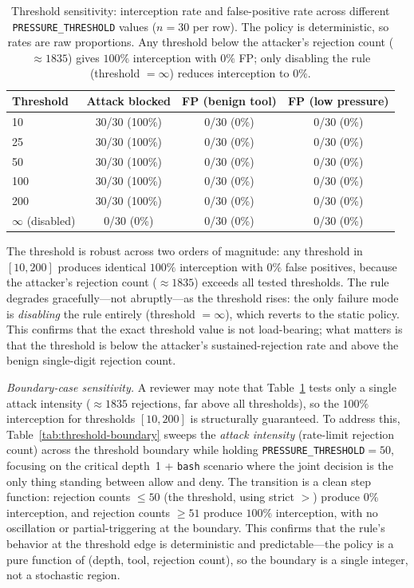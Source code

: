 \begin{table}[t]
\centering
\caption{Threshold sensitivity: interception rate and false-positive
rate across different \texttt{PRESSURE\_THRESHOLD} values ($n=30$ per
row). The policy is deterministic, so rates are raw proportions. Any
threshold below the attacker's rejection count ($\approx 1835$) gives
$100\%$ interception with $0\%$ FP; only disabling the rule (threshold
$=\infty$) reduces interception to $0\%$.}
\label{tab:ablation-threshold}
\begin{tabular}{lccc}
\toprule
Threshold & Attack blocked & FP (benign tool) & FP (low pressure) \\
\midrule
10        & 30/30 (100\%) & 0/30 (0\%) & 0/30 (0\%) \\
25        & 30/30 (100\%) & 0/30 (0\%) & 0/30 (0\%) \\
50        & 30/30 (100\%) & 0/30 (0\%) & 0/30 (0\%) \\
100       & 30/30 (100\%) & 0/30 (0\%) & 0/30 (0\%) \\
200       & 30/30 (100\%) & 0/30 (0\%) & 0/30 (0\%) \\
$\infty$ (disabled) & 0/30 (0\%) & 0/30 (0\%) & 0/30 (0\%) \\
\bottomrule
\end{tabular}
\end{table}

The threshold is robust across two orders of magnitude: any threshold
in $[10, 200]$ produces identical $100\%$ interception with $0\%$
false positives, because the attacker's rejection count ($\approx 1835$)
exceeds all tested thresholds. The rule degrades gracefully---not
abruptly---as the threshold rises: the only failure mode is
\emph{disabling} the rule entirely (threshold $= \infty$), which
reverts to the static policy. This confirms that the exact threshold
value is not load-bearing; what matters is that the threshold is below
the attacker's sustained-rejection rate and above the benign
single-digit rejection count.

\emph{Boundary-case sensitivity.} A reviewer may note that
Table~\ref{tab:ablation-threshold} tests only a single attack
intensity ($\approx 1835$ rejections, far above all thresholds), so the
$100\%$ interception for thresholds $[10, 200]$ is structurally
guaranteed. To address this, Table~\ref{tab:threshold-boundary} sweeps
the \emph{attack intensity} (rate-limit rejection count) across the
threshold boundary while holding \texttt{PRESSURE\_THRESHOLD}$=50$,
focusing on the critical depth~1 + \texttt{bash} scenario where the
joint decision is the only thing standing between allow and deny. The
transition is a clean step function: rejection counts $\leq 50$ (the
threshold, using strict $>$) produce $0\%$ interception, and rejection
counts $\geq 51$ produce $100\%$ interception, with no oscillation or
partial-triggering at the boundary. This confirms that the rule's
behavior at the threshold edge is deterministic and predictable---the
policy is a pure function of (depth, tool, rejection count), so the
boundary is a single integer, not a stochastic region.

